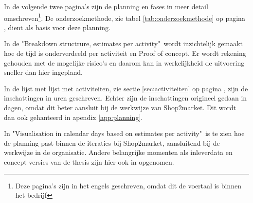 
In de volgende twee pagina's zijn de planning en fases in meer detail omschreven\footnote{ Deze pagina's zijn in het engels geschreven, omdat dit de voertaal is binnen het bedrijf }. De onderzoekmethode, zie tabel \ref{tab:onderzoekmethode} op pagina \pageref{tab:onderzoekmethode}, dient als basis voor deze planning.
\newline

In de "Breakdown structrure, estimates per activity"\ wordt inzichtelijk gemaakt hoe de tijd is onderverdeeld per activiteit en Proof of concept. Er wordt rekening gehouden met de mogelijke risico's en daarom kan in werkelijkheid de uitvoering sneller dan hier ingepland.

In de lijst met lijst met activiteiten, zie sectie \ref{sec:activiteiten} op pagina \pageref{sec:activiteiten}, zijn de inschattingen in uren geschreven. Echter zijn de inschattingen origineel gedaan in dagen, omdat dit beter aansluit bij de werkwijze van Shop2market. Dit wordt dan ook gehanteerd in apendix \ref{app:planning}.
\newline

In "Visualisation in calendar days based on estimates per activity"\ is te zien hoe de planning past binnen de iteraties bij Shop2market, aansluitend bij de werkwijze in de organisatie. Andere belangrijke momenten als inleverdata en concept versies van de thesis zijn hier ook in opgenomen.


